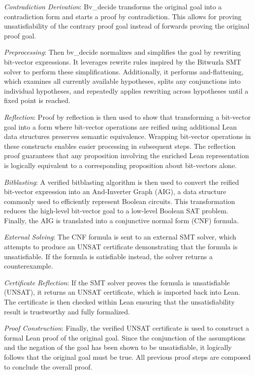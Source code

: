 \textit{Contradiction Derivation}: Bv\_decide transforms the original goal into a contradiction form and starts a proof by contradiction. This allows for proving unsatisfiability of the contrary proof goal instead of forwards proving the original proof goal. 

\textit{Preprocessing}: Then bv\_decide normalizes and simplifies the goal by rewriting bit-vector expressions. It leverages rewrite rules inspired by the Bitwuzla SMT solver to perform these simplifications. Additionally, it performs and-flattening, which examines all currently available hypotheses, splits any conjunctions into individual hypotheses, and repeatedly applies rewriting across hypotheses until a fixed point is reached.

\textit{Reflection}: Proof by reflection is then used to show that transforming a bit-vector goal into a form where bit-vector operations are reified using additional Lean data structures preserves semantic equivalence. Wrapping bit-vector operations in these constructs enables easier processing in subsequent steps. The reflection proof guarantees that any proposition involving the enriched Lean representation is logically equivalent to a corresponding proposition about bit-vectors alone.

\textit{Bitblasting}: A verified bitblasting algorithm is then used to convert the reified bit-vector expression into an And-Inverter Graph (AIG), a data structure commonly used to efficiently represent Boolean circuits. This transformation reduces the high-level bit-vector goal to a low-level Boolean SAT problem. Finally, the AIG is translated into a conjunctive normal form (CNF) formula.

\textit{External Solving}: The CNF formula is sent to an external SMT solver, which attempts to produce an UNSAT certificate demonstrating that the formula is unsatisfiable. If the formula is satisfiable instead, the solver returns a counterexample.

\textit{Certificate Reflection}: If the SMT solver proves the formula is unsatisfiable (UNSAT), it returns an UNSAT certificate, which is imported back into Lean. The certificate is then checked within Lean ensuring that the unsatisfiability result is trustworthy and fully formalized.

\textit{Proof Construction}: Finally, the verified UNSAT certificate is used to construct a formal Lean proof of the original goal. Since the conjunction of the assumptions and the negation of the goal has been shown to be unsatisfiable, it logically follows that the original goal must be true. All previous proof steps are composed to conclude the overall proof.

